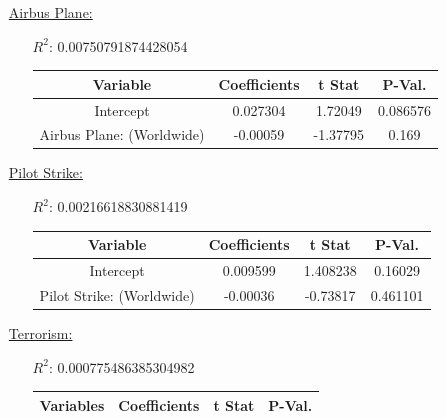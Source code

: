 \documentclass[12pt]{report}
\begin{document}
\begin{enumerate}
\begin{enumerate}
        \end{enumerate}
    \item[\underline{Airbus Plane:}]
        \begin{enumerate}
            \item[$R^2$:]0.00750791874428054
            \item[]
                \begin{tabular}{|c|c|c|c|}
                    \toprule\hline
                    \textbf{Variable} & \textbf{Coefficients} & \textbf{t Stat}&\textbf{P-Val.} \\\hline

                    Intercept & 0.027304 & 1.72049 & 0.086576\\ \hline
                    Airbus Plane: (Worldwide) & -0.00059 & -1.37795 & 0.169\\ \hline
                    \bottomrule
                \end{tabular}




        \end{enumerate}
    \item[\underline{Pilot Strike:}]
        \begin{enumerate}
            \item[$R^2$:]0.00216618830881419
            \item[]


                \begin{tabular}{|c|c|c|c|}
                    \toprule \hline
                    \textbf{Variable} & \textbf{Coefficients} & \textbf{t Stat} &\textbf{P-Val.}\\ \hline

                    Intercept & 0.009599 & 1.408238 &0.16029\\ \hline
                    Pilot Strike: (Worldwide) & -0.00036 & -0.73817 &0.461101\\ \hline
                    \bottomrule
                \end{tabular}



        \end{enumerate}
    \item[\underline{Terrorism:}]
        \begin{enumerate}
            \item[$R^2$:]0.000775486385304982
            \item[]


                \begin{tabular}{|c|c|c|c|}
                    \toprule \hline
                    \textbf{Variables} & \textbf{Coefficients} & \textbf{t Stat} &\textbf{P-Val.}\\ \hline


\end{tabular}
\end{enumerate}
\end{enumerate}
\end{document}
